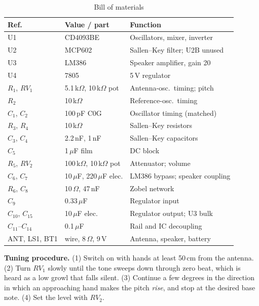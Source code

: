 \documentclass[conference]{IEEEtran}
\begin{document}
\begin{table}[!t]
\centering
\caption{Bill of materials}
\label{tab:bom}
\footnotesize
\setlength{\tabcolsep}{3pt}
\begin{tabular}{@{}llp{3.7cm}@{}}
\toprule
Ref. & Value / part & Function \\
\midrule
U1 & CD4093BE & Oscillators, mixer, inverter \\
U2 & MCP602 & Sallen--Key filter; U2B unused \\
U3 & LM386 & Speaker amplifier, gain 20 \\
U4 & 7805 & 5\,V regulator \\
$R_1$, $RV_1$ & 5.1\,k$\Omega$, 10\,k$\Omega$ pot & Antenna-osc.\ timing; pitch \\
$R_2$ & 10\,k$\Omega$ & Reference-osc.\ timing \\
$C_1$, $C_2$ & 100\,pF C0G & Oscillator timing (matched) \\
$R_3$, $R_4$ & 10\,k$\Omega$ & Sallen--Key resistors \\
$C_3$, $C_4$ & 2.2\,nF, 1\,nF & Sallen--Key capacitors \\
$C_5$ & 1\,$\mu$F film & DC block \\
$R_5$, $RV_2$ & 100\,k$\Omega$, 10\,k$\Omega$ pot & Attenuator; volume \\
$C_6$, $C_7$ & 10\,$\mu$F, 220\,$\mu$F elec. & LM386 bypass; speaker coupling \\
$R_6$, $C_8$ & 10\,$\Omega$, 47\,nF & Zobel network \\
$C_9$ & 0.33\,$\mu$F & Regulator input \\
$C_{10}$, $C_{15}$ & 10\,$\mu$F elec. & Regulator output; U3 bulk \\
$C_{11}$--$C_{14}$ & 0.1\,$\mu$F & Rail and IC decoupling \\
ANT, LS1, BT1 & wire, 8\,$\Omega$, 9\,V & Antenna, speaker, battery \\
\bottomrule
\end{tabular}
\end{table}

\textbf{Tuning procedure.} (1) Switch on with hands at least 50\,cm from the antenna. (2) Turn $RV_1$ slowly until the tone sweeps down through zero beat, which is heard as a low growl that falls silent. (3) Continue a few degrees in the direction in which an approaching hand makes the pitch \emph{rise}, and stop at the desired base note. (4) Set the level with $RV_2$.

\end{document}
